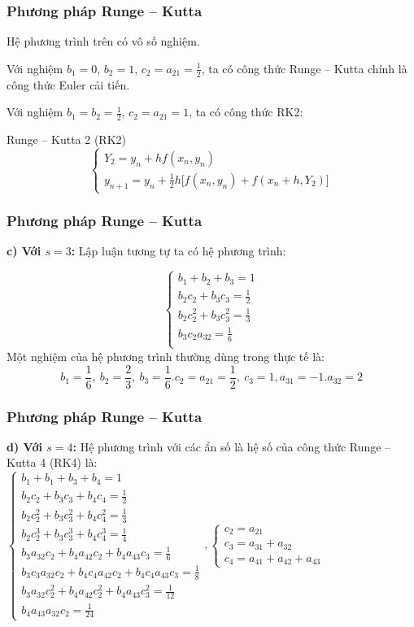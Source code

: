 \begin{frame}
	\frametitle{Phương pháp Runge – Kutta}
	Hệ phương trình trên có vô số nghiệm.\par
	Với nghiệm $b_1=0$, $b_2=1$, $c_2=a_{21}=\frac12$, ta có công thức Runge – Kutta chính là công thức Euler cải tiến.\par
	Với nghiệm $b_1=b_2=\frac12$, $c_2=a_{21}=1$, ta có công thức RK2:\par
	\begin{block}{Runge – Kutta 2 (RK2)}
		$$\begin{cases}
			Y_2=y_n+hf(x_n,y_n)\\
			y_{n+1}=y_n+\frac12h\big[f(x_n,y_n)+f(x_n+h,Y_2)\big]
		\end{cases}$$
		\end{block}
\end{frame}

\begin{frame}
	\frametitle{Phương pháp Runge – Kutta}
	\textbf{c) Với $s=3$:} Lập luận tương tự ta có hệ phương trình:\par
	$$\begin{cases}
		b_1+b_2+b_3=1\\
		b_2 c_2 + b_3 c_3 =\frac12\\
		b_2 c_2^2 + b_3 c_3^2=\frac13\\
		b_3 c_2 a_{32}=\frac16\\
	\end{cases}$$
	Một nghiệm của hệ phương trình thường dùng trong thực tế là:
	$$b_1=\frac16,~b_2=\frac23,~b_3=\frac16. c_2=a_{21}=\frac12,~c_3=1,a_{31}=-1.a_{32}=2$$
\end{frame}

\begin{frame}
	\frametitle{Phương pháp Runge – Kutta}
	\textbf{d) Với $s=4$:} Hệ phương trình với các ẩn số là hệ số của công thức Runge – Kutta 4 (RK4) là:\\
		$\begin{cases}
			b_1+b_1+b_3+b_4=1\\
			b_2c_2+b_3c_3+b_4c_4=\frac12\\
			b_2c_2^2+b_3c_3^2+b_4c_4^2=\frac13\\
			b_2c_2^3+b_3c_3^3+b_4c_4^3=\frac14\\
			b_3a_{32}c_2+b_4a_{42}c_2+b_4a_{43}c_3=\frac16\\
			b_3c_3a_{32}c_2+b_4c_4a_{42}c_2+b_4c_4a_{43}c_3=\frac18\\
			b_3a_{32}c_2^2+b_4a_{42}c_2^2+b_4a_{43}c_3^2=\frac{1}{12}\\
			b_4a_{43}a_{32}c_2=\frac{1}{24}
		\end{cases},
		\begin{cases}
			c_2=a_{21}\\
			c_3=a_{31}+a_{32}\\
			c_4=a_{41}+a_{42}+a_{43}
		\end{cases}$
\end{frame}


